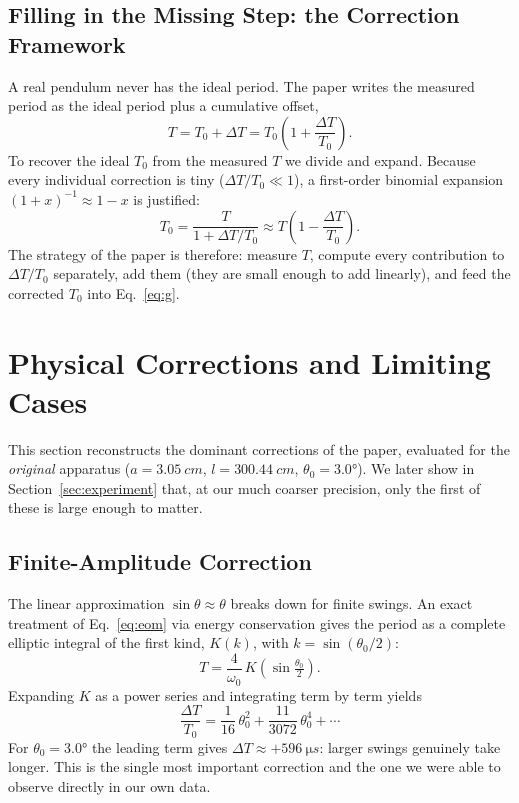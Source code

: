 \documentclass[11pt]{article}
\begin{document}
\subsection{Filling in the Missing Step: the Correction Framework}

A real pendulum never has the ideal period. The paper writes the measured period as the
ideal period plus a cumulative offset,
\begin{equation}
T = T_0 + \Delta T = T_0\!\left(1 + \frac{\Delta T}{T_0}\right).
\label{eq:framework}
\end{equation}
To recover the ideal $T_0$ from the measured $T$ we divide and expand. Because every
individual correction is tiny ($\Delta T/T_0 \ll 1$), a first-order binomial expansion
$(1+x)^{-1}\approx 1-x$ is justified:
\begin{equation}
T_0 = \frac{T}{1 + \Delta T/T_0} \approx T\!\left(1 - \frac{\Delta T}{T_0}\right).
\label{eq:T0recover}
\end{equation}
The strategy of the paper is therefore: measure $T$, compute every contribution to
$\Delta T/T_0$ separately, add them (they are small enough to add linearly), and feed the
corrected $T_0$ into Eq.~\eqref{eq:g}.

\section{Physical Corrections and Limiting Cases}

This section reconstructs the dominant corrections of the paper, evaluated for the
\emph{original} apparatus ($a=\SI{3.05}{cm}$, $l=\SI{300.44}{cm}$, $\theta_0=\ang{3.0}$).
We later show in Section~\ref{sec:experiment} that, at our much coarser precision, only
the first of these is large enough to matter.

\subsection{Finite-Amplitude Correction}
The linear approximation $\sin\theta\approx\theta$ breaks down for finite swings. An exact
treatment of Eq.~\eqref{eq:eom} via energy conservation gives the period as a complete
elliptic integral of the first kind, $K(k)$, with $k=\sin(\theta_0/2)$:
\begin{equation}
T = \frac{4}{\omega_0}\,K\!\left(\sin\tfrac{\theta_0}{2}\right).
\end{equation}
Expanding $K$ as a power series and integrating term by term yields
\begin{equation}
\frac{\Delta T}{T_0} = \frac{1}{16}\,\theta_0^{2} + \frac{11}{3072}\,\theta_0^{4} + \cdots
\label{eq:famp}
\end{equation}
For $\theta_0=\ang{3.0}$ the leading term gives $\Delta T \approx +\SI{596}{\micro s}$:
larger swings genuinely take longer. This is the single most important correction and the
one we were able to observe directly in our own data.
\end{document}

